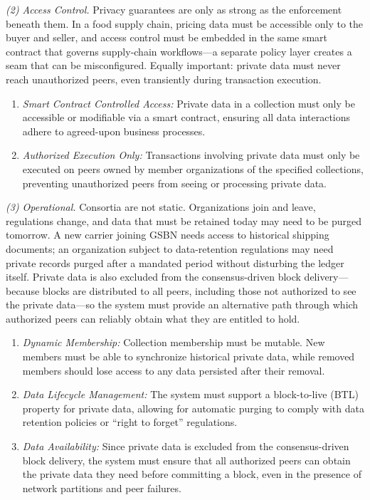 \noindent\textit{(2) Access Control.} Privacy guarantees are only as strong as the enforcement beneath them. In a food supply chain, pricing data must be accessible only to the buyer and seller, and access control must be embedded in the same smart contract that governs supply-chain workflows---a separate policy layer creates a seam that can be misconfigured. Equally important: private data must never reach unauthorized peers, even transiently during transaction execution.
\begin{enumerate}[topsep=0pt,noitemsep,leftmargin=15pt]
\item[\textbf{R3}] \textit{Smart Contract Controlled Access:} Private data in a collection must only be accessible or modifiable via a smart contract, ensuring all data interactions adhere to agreed-upon business processes.
\item[\textbf{R4}] \textit{Authorized Execution Only:} Transactions involving private data must only be executed on peers owned by member organizations of the specified collections, preventing unauthorized peers from seeing or processing private data.
\end{enumerate}

\noindent\textit{(3) Operational.} Consortia are not static. Organizations join and leave, regulations change, and data that must be retained today may need to be purged tomorrow. A new carrier joining GSBN needs access to historical shipping documents; an organization subject to data-retention regulations may need private records purged after a mandated period without disturbing the ledger itself. Private data is also excluded from the consensus-driven block delivery---because blocks are distributed to all peers, including those not authorized to see the private data---so the system must provide an alternative path through which authorized peers can reliably obtain what they are entitled to hold.
\begin{enumerate}[topsep=0pt,noitemsep,leftmargin=15pt]
\item[\textbf{R5}] \textit{Dynamic Membership:} Collection membership must be mutable. New members must be able to synchronize historical private data, while removed members should lose access to any data persisted after their removal.
\item[\textbf{R6}] \textit{Data Lifecycle Management:} The system must support a block-to-live (BTL) property for private data, allowing for automatic purging to comply with data retention policies or ``right to forget'' regulations.
\item[\textbf{R7}] \textit{Data Availability:} Since private data is excluded from the consensus-driven block delivery, the system must ensure that all authorized peers can obtain the private data they need before committing a block, even in the presence of network partitions and peer failures.
\end{enumerate}

